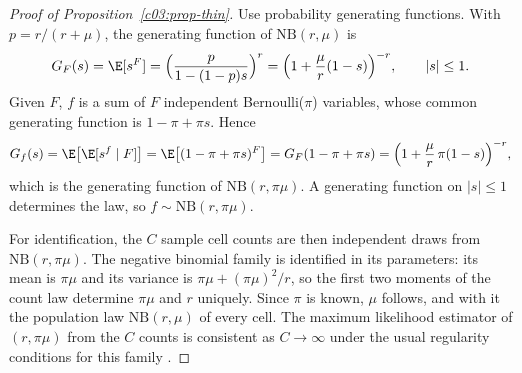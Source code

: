\begin{proof}[Proof of Proposition~\ref{c03:prop-thin}]
Use probability generating functions. With $p = r/(r+\mu)$, the generating function of
$\mathrm{NB}(r,\mu)$ is
\[
G_F(s) = \E[s^F] = \Big(\frac{p}{1-(1-p)s}\Big)^{r}
= \Big(1 + \frac{\mu}{r}(1-s)\Big)^{-r}, \qquad |s| \le 1 .
\]
Given $F$, $f$ is a sum of $F$ independent Bernoulli($\pi$) variables, whose common
generating function is $1-\pi+\pi s$. Hence
\[
G_f(s) = \E\big[\E[s^f \mid F]\big] = \E\big[(1-\pi+\pi s)^F\big]
= G_F(1-\pi+\pi s)
= \Big(1 + \frac{\mu}{r}\,\pi(1-s)\Big)^{-r},
\]
which is the generating function of $\mathrm{NB}(r,\pi\mu)$. A generating function on
$|s|\le 1$ determines the law, so $f \sim \mathrm{NB}(r,\pi\mu)$.

For identification, the $C$ sample cell counts are then independent draws from
$\mathrm{NB}(r,\pi\mu)$. The negative binomial family is identified in its parameters:
its mean is $\pi\mu$ and its variance is $\pi\mu + (\pi\mu)^2/r$, so the first two
moments of the count law determine $\pi\mu$ and $r$ uniquely. Since $\pi$ is known,
$\mu$ follows, and with it the population law $\mathrm{NB}(r,\mu)$ of every cell. The
maximum likelihood estimator of $(r,\pi\mu)$ from the $C$ counts is consistent as
$C \to \infty$ under the usual regularity conditions for this family
\citep{vandervaart1998}.
\end{proof}
